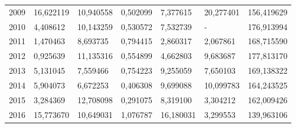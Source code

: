 \begin{table}
\begin{tabular}{p{1cm}p{2cm}p{2cm}p{2cm}p{2cm}p{2cm}p{2cm}}
 2009 &                        16,622119 &                       10,940558 &                                    0,502099 &                          7,377615 &              20,277401 &                     156,419629 \\
 2010 &                         4,408612 &                       10,143259 &                                    0,530572 &                          7,532739 &                      - &                     176,913994 \\
 2011 &                         1,470463 &                        8,693735 &                                    0,794415 &                          2,860317 &               2,067861 &                     168,715590 \\
 2012 &                         0,925639 &                       11,135316 &                                    0,554899 &                          4,662803 &               9,683687 &                     177,813170 \\
 2013 &                         5,131045 &                        7,559466 &                                    0,754223 &                          9,255059 &               7,650103 &                     169,138322 \\
 2014 &                         5,904073 &                        6,672253 &                                    0,406308 &                          9,699088 &              10,099783 &                     164,243525 \\
 2015 &                         3,284369 &                       12,708098 &                                    0,291075 &                          8,319100 &               3,304212 &                     162,009426 \\
 2016 &                        15,773670 &                       10,649031 &                                    1,076787 &                         16,180031 &               3,299553 &                     139,963106 \\
\bottomrule
\end{tabular}
\end{table}

